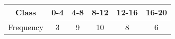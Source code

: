 \begin{tabular}{|c|c|c|c|c|c|}
\hline
Class & 0-4 & 4-8 & 8-12 & 12-16 & 16-20 \\ 
\hline
Frequency & 3 & 9 & 10 & 8 & 6 \\
\hline
\end{tabular}
